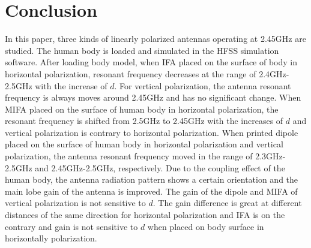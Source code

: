\documentclass[journal]{IEEEtran}
\begin{document}
\section{Conclusion}
In this paper, three kinds of linearly polarized antennas operating at 2.45GHz are studied. The human body is loaded and simulated in the HFSS simulation software. After loading body model, when IFA placed on the surface of body in horizontal polarization, resonant frequency decreases at the range of 2.4GHz-2.5GHz with the increase of $d$. For vertical polarization, the antenna resonant frequency is always moves around 2.45GHz and has no significant change. When MIFA placed on the surface of human body in horizontal polarization, the resonant frequency is shifted from 2.5GHz to 2.45GHz with the increases of $d$ and vertical polarization is contrary to horizontal polarization. When printed dipole placed on the surface of human body in horizontal polarization and vertical polarization, the antenna resonant frequency moved in the range of 2.3GHz-2.5GHz and 2.45GHz-2.5GHz, respectively. Due to the coupling effect of the human body, the antenna radiation pattern shows a certain orientation and the main lobe gain of the antenna is improved. The gain of the dipole and MIFA of vertical polarization is not sensitive to $d$. The gain difference is great at different distances of the same direction for horizontal polarization and IFA is on the contrary and gain is not sensitive to $d$ when placed on body surface in horizontally polarization.

\ifCLASSOPTIONcaptionsoff
  \newpage
\fi
\end{document}
